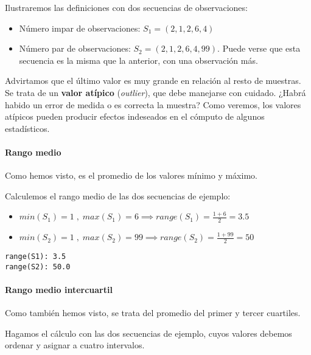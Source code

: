 \documentclass[11pt]{article}
\providecommand{\tightlist}{%
      \setlength{\itemsep}{0pt}\setlength{\parskip}{0pt}}
\begin{document}
    Ilustraremos las definiciones con dos secuencias de observaciones:

\begin{itemize}
\tightlist
\item
  Número impar de observaciones: \(S_1 = (2, 1, 2, 6, 4)\)
\item
  Número par de observaciones: \(S_2 = (2, 1, 2, 6, 4, 99)\). Puede
  verse que esta secuencia es la misma que la anterior, con una
  observación más.
\end{itemize}

Advirtamos que el último valor es muy grande en relación al resto de
muestras. Se trata de un \textbf{valor atípico} (\emph{outlier}), que
debe manejarse con cuidado. ¿Habrá habido un error de medida o es
correcta la muestra? Como veremos, los valores atípicos pueden producir
efectos indeseados en el cómputo de algunos estadísticos.


    \paragraph{Rango medio}\label{rango-medio}

Como hemos visto, es el promedio de los valores mínimo y máximo.

Calculemos el rango medio de las dos secuencias de ejemplo:

\begin{itemize}
\tightlist
\item
  \(min(S_1) = 1 \; , \; max(S_1) = 6 \implies range(S_1) = \frac{1+6}{2} = 3.5\)
\item
  \(min(S_2) = 1 \; , \; max(S_2) = 99 \implies range(S_2) = \frac{1+99}{2} = 50\)
\end{itemize}


    \begin{Verbatim}[commandchars=\\\{\}]
range(S1): 3.5
range(S2): 50.0

    \end{Verbatim}

    \paragraph{Rango medio intercuartil}\label{rango-medio-intercuartil}

Como también hemos visto, se trata del promedio del primer y tercer
cuartiles.

Hagamos el cálculo con las dos secuencias de ejemplo, cuyos valores
debemos ordenar y asignar a cuatro intervalos.
\end{document}
